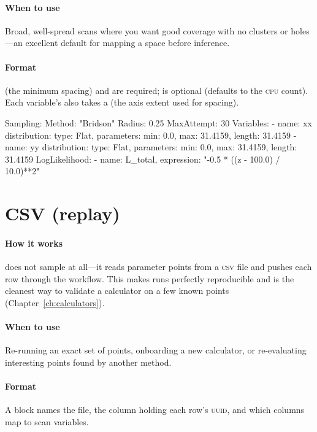 \paragraph{When to use} Broad, well-spread scans where you want good coverage with no clusters or
holes---an excellent default for mapping a space before inference.

\paragraph{Format}  (the minimum spacing) and  are required;
 is optional (defaults to the \textsc{cpu} count). Each variable's
 also takes a  (the axis extent used for spacing).

\begin{yamlwin}
Sampling:
  Method: "Bridson"
  Radius: 0.25
  MaxAttempt: 30
  Variables:
    - name: xx
      distribution: {type: Flat, parameters: {min: 0.0, max: 31.4159, length: 31.4159}}
    - name: yy
      distribution: {type: Flat, parameters: {min: 0.0, max: 31.4159, length: 31.4159}}
  LogLikelihood:
    - {name: L_total, expression: "-0.5 * ((z - 100.0) / 10.0)**2"}
\end{yamlwin}

\section{CSV (replay)}
\label{sec:s-csv}

\paragraph{How it works}  does not sample at all---it reads parameter points from a
\textsc{csv} file and pushes each row through the workflow. This makes runs perfectly
reproducible and is the cleanest way to validate a calculator on a few known points
(Chapter~\ref{ch:calculators}).

\paragraph{When to use} Re-running an exact set of points, onboarding a new calculator, or
re-evaluating interesting points found by another method.

\paragraph{Format} A  block names the file, the column holding each row's
\textsc{uuid}, and which columns map to scan variables.

